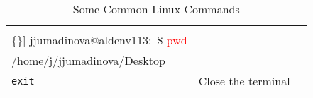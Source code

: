\begin{table}[htbp]
\begin{tabular}{l|p{1.5in}|p{2.5in}}
\begin{minipage}{2.5in}
\begin{Verbatim}[commandchars=\\\{\}]
jjumadinova@aldenv113:~\$ \textcolor{red}{pwd} \\
/home/j/jjumadinova/Desktop
\end{Verbatim}
\end{minipage}\\
\hline
\rule{0em}{1.5em}\tt exit  & Close the terminal  &\\
\hline
\end{tabular}
\caption{Some Common Linux Commands}
\label{linux}
\end{table}


